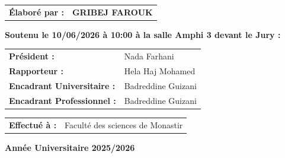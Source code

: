 \begin{titlepage}
\begin{center}
\begin{tabular}{ll}
\textbf{Élaboré par :} & \textbf{GRIBEJ FAROUK}
\end{tabular}
\end{center}

\vspace{0.3cm}

\begin{center}
\textbf{Soutenu le 10/06/2026 à 10:00 à la salle Amphi 3 devant le Jury :}
\end{center}

\vspace{0.5cm}

\begin{center}
\begin{tabular}{ll}
\textbf{Président :} & Nada Farhani \\[0.3cm]
\textbf{Rapporteur :} & Hela Haj Mohamed \\[0.3cm]
\textbf{Encadrant Universitaire :} & Badreddine Guizani \\[0.3cm]
\textbf{Encadrant Professionnel :} & Badreddine Guizani
\end{tabular}
\end{center}

\vspace{1cm}

\begin{center}
\begin{tabular}{ll}
\textbf{Effectué à :} & Faculté des sciences de Monastir
\end{tabular}
\end{center}

\vfill

\begin{center}
\textbf{Année Universitaire 2025/2026}
\end{center}

\end{titlepage}
